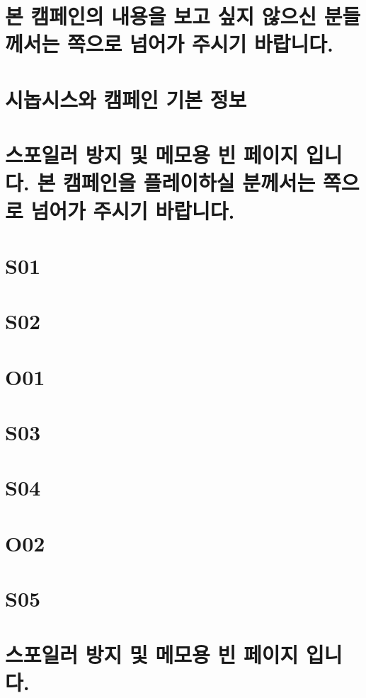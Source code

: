 \documentclass{report}
\begin{document}
	\chapter*{본 캠페인의 내용을 보고 싶지 않으신 분들께서는 \pageref{endof_Rescue}쪽으로 넘어가 주시기 바랍니다.}
	
	\chapter{시놉시스와 캠페인 기본 정보}
		
	
	\chapter*{스포일러 방지 및 메모용 빈 페이지 입니다. 본 캠페인을 플레이하실 분께서는 \pageref{endof_Rescue}쪽으로 넘어가 주시기 바랍니다.}
	
	\parttoc
	
	\chapter{S01}
		
	\label{endof_Rescue_S01}
	
	\chapter{S02}
		
	\label{endof_Rescue_S02}
	
	\chapter{O01}
		
	\label{endof_Rescue_O01}
	
	\chapter{S03}
		
	\label{endof_Rescue_S03}
	
	\chapter{S04}
		
	\label{endof_Rescue_S04}
	
	\chapter{O02}
		
	\label{endof_Rescue_O02}
	
	\chapter{S05}
		
	\label{endof_Rescue_S05}
	
	\chapter*{스포일러 방지 및 메모용 빈 페이지 입니다.}
\end{document}
